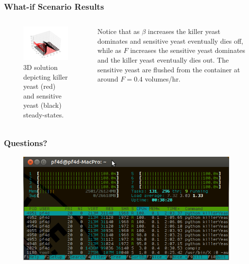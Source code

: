 \documentclass{beamer}
\begin{document}
\begin{frame}
  \frametitle{What-if Scenario Results}
  \begin{columns}
  \begin{column}{0.6\textwidth}
  \begin{figure}[H]
    \centering
      \includegraphics[width=1.0\textwidth]{../doc/images/3d.png}
    \caption{\footnotesize 3D solution depicting killer yeast (red) and sensitive yeast (black) steady-states.}
  \end{figure}
  \end{column}
  \begin{column}{0.4\textwidth}
  \footnotesize Notice that as $\beta$ increases the killer yeast dominates and sensitive yeast eventually dies off, while as $F$ increases the sensitive yeast dominates and the killer yeast eventually dies out.  The sensitive yeast are flushed from the container at around $F = 0.4$ volumes/hr.
  \normalsize
  \end{column}
  \end{columns}
\end{frame}

\begin{frame}
  \frametitle{Questions?}
  \begin{figure}[H]
    \centering
      \includegraphics[width=1.0\textwidth]{images/cpuUse.png}
  \end{figure}

\end{frame}
\end{document}
